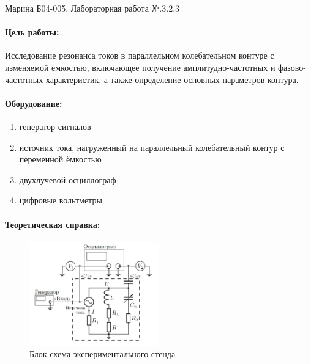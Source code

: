 \documentclass[a4paper,12pt]{article}
\author{Бичина Марина 
группа Б04-005 1 курса ФЭФМ}
\title{}
\date{}
\begin{document}

\begin{center}
\begin{Large}
{ Марина Б04-005, Лабораторная работа №.3.2.3}
\end{Large}
\end{center}
\paragraph{Цель работы:} 

Исследование резонанса токов в параллельном колебательном контуре с
изменяемой ёмкостью, включающее получение амплитудно-частотных и фазово-частотных
характеристик, а также определение основных параметров контура.

\paragraph{Оборудование:}
\begin{enumerate}
\itemsep0em
\item генератор сигналов
\item источник тока, нагруженный на параллельный колебательный контур с переменной ёмкостью
\item двухлучевой осциллограф
\item цифровые вольтметры
\end{enumerate}

\FloatBarrier

\paragraph{Теоретическая справка:}

\begin{figure}
\centering
\includegraphics[width=0.5\textwidth]{setup.png}
\caption{Блок-схема экспериментального стенда}
\end{figure}

\paragraph{}
\end{document}
